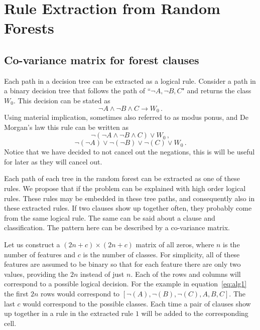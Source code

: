\documentclass[10pt]{article}
\begin{document}
\section{Rule Extraction from Random Forests}
\label{sec:alg}
\subsection{Co-variance matrix for forest clauses}
Each path in a decision tree can be extracted as a logical rule. Consider a path in a binary decision tree that follows the path of ``$\neg A, \neg B, C$" and returns the class $W_0$. This decision can be stated as 
\[\neg A \land \neg B \land C \rightarrow W_0 \,.\]
Using material implication, sometimes also referred to as modus ponus, and De Morgan's law this rule can be written as 
\[\neg\left(\neg A \land \neg B \land C\right) \lor W_0 \, , \]
\begin{equation}
\neg(\neg A) \lor \neg (\neg B) \lor \neg(C) \lor W_0 \, .
\label{eq:alg1}
\end{equation}
Notice that we have decided to not cancel out the negations, this is will be useful for later as they will cancel out. 

Each path of each tree in the random forest can be extracted as one of these rules. We propose that if the problem can be explained with high order logical rules. These rules may be embedded in these tree paths, and consequently also in these extracted rules. If two clauses show up together often, they probably come from the same logical rule. The same can be said about a clause and classification. The pattern here can be described by a co-variance matrix. 

Let us construct a $(2n +c) \times (2n+c)$ matrix of all zeros, where $n$ is the number of features and $c$ is the number of classes. For simplicity, all of these features are assumed to be binary so that for each feature there are only two values, providing the $2n$ instead of just $n$. Each of the rows and columns will correspond to a possible logical decision. For the example in equation~\ref{eq:alg1} the first $2n$ rows would correspond to $[\neg(A), \neg(B), \neg(C), A, B, C]$. The last $c$ would correspond to the possible classes. Each time a pair of clauses show up together in a rule in the extracted rule $1$ will be added to the corresponding cell. 
\end{document}
